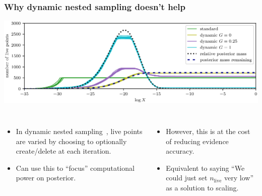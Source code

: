 \documentclass[aspectratio=169]{beamer}
\begin{document}
\begin{frame}
    \frametitle{Why dynamic nested sampling doesn't help}
    \includegraphics[width=\textwidth]{figures/dynamic}
    \vspace{-20pt}
    \begin{columns}
        \begin{itemize}
            \item In dynamic nested sampling~, live points are varied by choosing to optionally create/delete at each iteration.
            \item Can use this to ``focus'' computational power on posterior.
        \end{itemize}
        \begin{itemize}
            \item However, this is at the cost of reducing evidence accuracy.
            \item Equivalent to saying ``We could just set $n_\text{live}$ very low'' as a solution to scaling.
        \end{itemize}
    \end{columns}
\end{frame}
\end{document}
